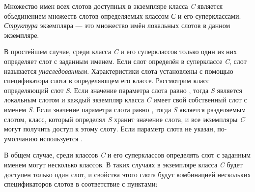 Множество имен всех слотов доступных в экземпляре класса \emph{C} является
объединением множеств слотов определяемых классом \emph{С} и его суперклассами.
\emph{Структура} экземпляра --- это множество имён локальных слотов в данном
экземпляре.

В простейшем случае, среди класса \emph{C} и его суперклассов только один из них
определяет слот с заданным именем. Если слот определён в суперклассе \emph{C},
слот называется \emph{унаследованным}. Характеристики слота установлены с
помощью спецификатора слота в определяющем его классе. Рассмотрим класс
определяющий слот \emph{S}. Если значение параметра слота  равно
, тогда \emph{S} является локальным слотом и каждый экземпляр
класса \emph{C} имеет свой собственный слот с именем \emph{S}. Если значение
параметра слота  равно , тогда \emph{S} является
разделяемым слотом, класс, который определял \emph{S} хранит значение слота, и
все экземпляры \emph{C} могут получить доступ к этому слоту. Если параметр слота
 не указан, по-умолчанию используется .

В общем случае, среди классов \emph{C} и его суперклассов определять слот с
заданным именем могут несколько классов. В таких случаях в экземпляре класса
\emph{C} будет доступен только один слот, и свойства этого слота будут
комбинацией нескольких спецификаторов слотов в соответствие с пунктами:

